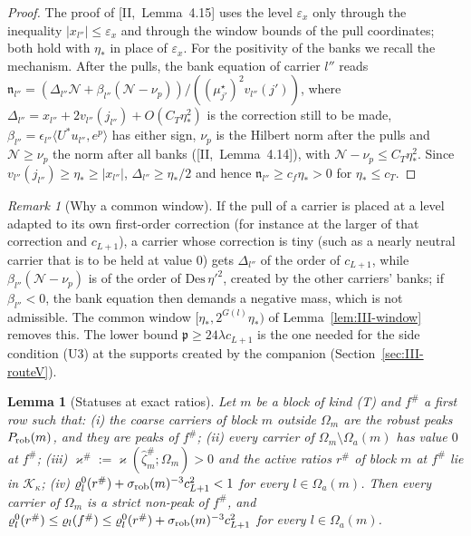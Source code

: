 \documentclass[10pt]{amsart}
\newtheorem{lemma}[theorem]{Lemma}
\theoremstyle{definition}
\theoremstyle{remark}
\newtheorem{remark}[theorem]{Remark}
\newcommand{\ip}[2]{\langle #1,#2\rangle}
\begin{document}
\begin{proof}
The proof of [II,~Lemma~4.15] uses the level $\varepsilon_x$ only through the
inequality $|x_{l''}|\le\varepsilon_x$ and through the window bounds of the
pull coordinates; both hold with $\eta_*$ in place of $\varepsilon_x$.  For the
positivity of the banks we recall the mechanism.  After the pulls, the
bank equation of carrier $l''$ reads $\mathfrak n_{l''}=(\Delta_{l''}\mathcal N+
\beta_{l''}(\mathcal N-\nu_p))/((\mu^\star_{j'})^2v_{l''}(j'))$, where $\Delta_{l''}=
x_{l''}+2v_{l''}(j_{l''})+O(C_T\eta_*^2)$ is the correction still to be made,
$\beta_{l''}=\epsilon_{l''}\ip{U^*u_{l''}}{e^p}$ has either sign, $\nu_p$ is
the Hilbert norm after the pulls and $\mathcal N\ge\nu_p$ the norm after all
banks ([II,~Lemma~4.14]), with $\mathcal N-\nu_p\le C_T\eta_*^2$.  Since
$v_{l''}(j_{l''})\ge\eta_*\ge|x_{l''}|$, $\Delta_{l''}\ge\eta_*/2$ and hence
$\mathfrak n_{l''}\ge c_f\eta_*>0$ for $\eta_*\le c_T$.
\end{proof}

\begin{remark}[Why a common window]\label{rem:III-window}
If the pull of a carrier is placed at a level adapted to its own first-order
correction (for instance at the larger of that correction and $c_{L+1}$), a
carrier whose correction is tiny (such as a nearly neutral carrier that is
to be held at value $0$) gets $\Delta_{l''}$ of the order of $c_{L+1}$, while
$\beta_{l''}(\mathcal N-\nu_p)$ is of the order of $\mathrm{Des}\,\eta'^2$, created
by the other carriers' banks; if $\beta_{l''}<0$, the bank equation then
demands a negative mass, which is not admissible.  The common window
$[\eta_*,2^{G(l)}\eta_*)$ of Lemma~\ref{lem:III-window} removes this.  The lower
bound $\mathfrak p\ge24\lambda c_{L+1}$ is the one needed for the side condition
(U3) at the supports created by the companion (Section~\ref{sec:III-routeV}).
\end{remark}

\begin{lemma}[Statuses at exact ratios]\label{lem:III-status}
Let $m$ be a block of kind \textup{(T)} and $f^\#$ a first row such that:
\textup{(i)} the coarse carriers of block $m$ outside $\Omega_m$ are the
robust peaks $P_{\rm rob}(m)$, and they are peaks of $f^\#$; \textup{(ii)}
every carrier of $\Omega_m\setminus\Omega_a(m)$ has value $0$ at $f^\#$;
\textup{(iii)} $\varkappa^\#:=\varkappa(\hat\zeta^\#_m;\Omega_m)>0$ and the active
ratios $r^\#$ of block $m$ at $f^\#$ lie in $\mathcal K_\kappa$; \textup{(iv)}
$\varrho^0_l(r^\#)+\sigma_{\rm rob}(m)^{-3}c_{L+1}^2<1$ for every $l\in\Omega_a(m)$.
Then every carrier of $\Omega_m$ is a strict non-peak of $f^\#$, and
$\varrho^0_l(r^\#)\le\varrho_l(f^\#)\le\varrho^0_l(r^\#)+\sigma_{\rm rob}(m)^{-3}
c_{L+1}^2$ for every $l\in\Omega_a(m)$.
\end{lemma}
\end{document}

